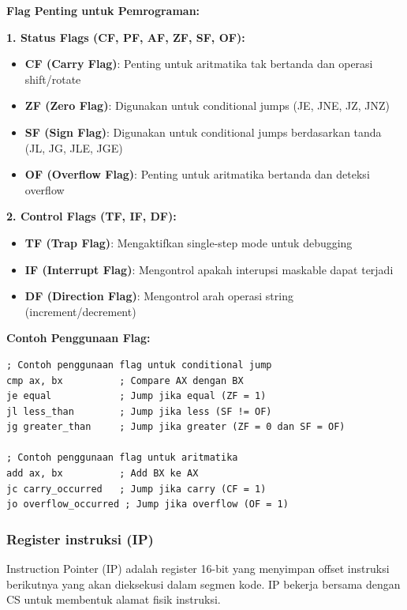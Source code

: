 \documentclass[../main.tex]{subfiles}
\begin{document}
\textbf{Flag Penting untuk Pemrograman:}

\textbf{1. Status Flags (CF, PF, AF, ZF, SF, OF):}
\begin{itemize}
    \item \textbf{CF (Carry Flag)}: Penting untuk aritmatika tak bertanda dan operasi shift/rotate
    \item \textbf{ZF (Zero Flag)}: Digunakan untuk conditional jumps (JE, JNE, JZ, JNZ)
    \item \textbf{SF (Sign Flag)}: Digunakan untuk conditional jumps berdasarkan tanda (JL, JG, JLE, JGE)
    \item \textbf{OF (Overflow Flag)}: Penting untuk aritmatika bertanda dan deteksi overflow
\end{itemize}

\textbf{2. Control Flags (TF, IF, DF):}
\begin{itemize}
    \item \textbf{TF (Trap Flag)}: Mengaktifkan single-step mode untuk debugging
    \item \textbf{IF (Interrupt Flag)}: Mengontrol apakah interupsi maskable dapat terjadi
    \item \textbf{DF (Direction Flag)}: Mengontrol arah operasi string (increment/decrement)
\end{itemize}

\textbf{Contoh Penggunaan Flag:}
\begin{lstlisting}[language={[x86masm]Assembler}, caption=Penggunaan Flag untuk Conditional Jump, label={lst:flag-usage-ch02}]
; Contoh penggunaan flag untuk conditional jump
cmp ax, bx          ; Compare AX dengan BX
je equal            ; Jump jika equal (ZF = 1)
jl less_than        ; Jump jika less (SF != OF)
jg greater_than     ; Jump jika greater (ZF = 0 dan SF = OF)

; Contoh penggunaan flag untuk aritmatika
add ax, bx          ; Add BX ke AX
jc carry_occurred   ; Jump jika carry (CF = 1)
jo overflow_occurred ; Jump jika overflow (OF = 1)
\end{lstlisting}

\subsubsection{Register instruksi (IP)}
    Instruction Pointer (IP) adalah register 16-bit yang menyimpan offset instruksi berikutnya yang akan dieksekusi dalam segmen kode. IP bekerja bersama dengan CS untuk membentuk alamat fisik instruksi.
\end{document}
